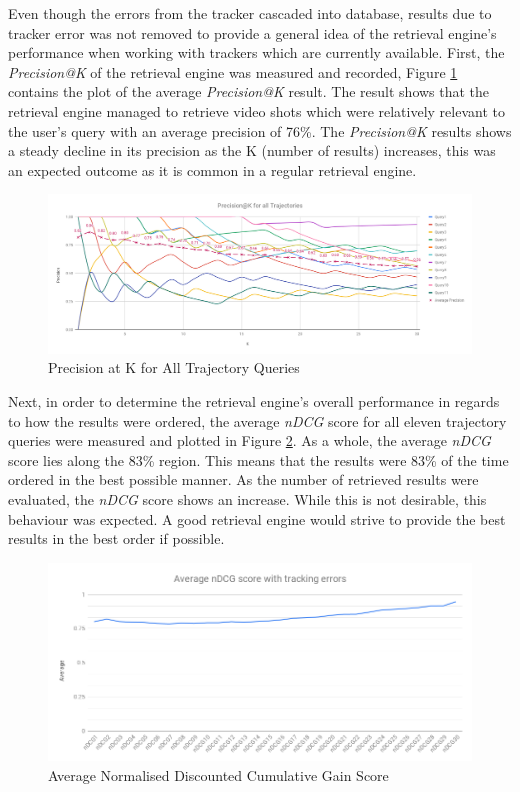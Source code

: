 Even though the errors from the tracker\cite{lim2017} cascaded into database, results due to tracker error was not removed to provide a general idea of the retrieval engine's performance when working with trackers which are currently available. First, the \textit{Precision@K} of the retrieval engine was measured and recorded, Figure \ref{fig:versionTwoPreAtK} contains the plot of the average \textit{Precision@K} result. The result shows that the retrieval engine managed to retrieve video shots which were relatively relevant to the user's query with an average precision of 76\%. The \textit{Precision@K} results shows a steady decline in its precision as the K (number of results) increases, this was an expected outcome as it is common in a regular retrieval engine.

\begin{figure}[!ht]
  \centering
    \includegraphics[width=\linewidth]{image/retrievalTwo/p@k.png}
  \caption{Precision at K for All Trajectory Queries}
  \label{fig:versionTwoPreAtK}
\end{figure}

Next, in order to determine the retrieval engine's overall performance in regards to how the results were ordered, the average \textit{nDCG} score for all eleven trajectory queries were measured and plotted in Figure \ref{fig:ndcgWithError}. As a whole, the average \textit{nDCG} score lies along the 83\% region. This means that the results were 83\% of the time ordered in the best possible manner. As the number of retrieved results were evaluated, the \textit{nDCG} score shows an increase.
While this is not desirable, this behaviour was expected. A good retrieval engine would strive to provide the best results in the best order if possible.

\begin{figure}[!ht]
  \centering
    \includegraphics[width=0.9\linewidth]{image/retrievalTwo/averageNDCG.png}
  \caption{Average Normalised Discounted Cumulative Gain Score}
  \label{fig:ndcgWithError}
\end{figure}


